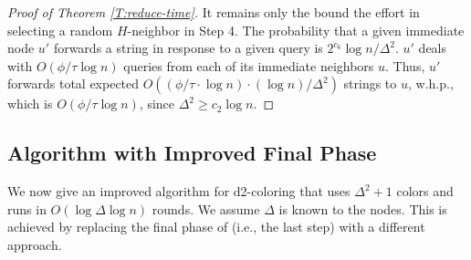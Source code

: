 \begin{proof}[Proof of Theorem \ref{T:reduce-time}]
It remains only the bound the effort in selecting a random $H$-neighbor in Step 4.
The probability that a given immediate node $u'$ forwards a string in response to a given query is $2^{c_6}\log n / \Delta^2$. $u'$ deals with $O(\phi/\tau \log n)$ queries from each of its immediate neighbors $u$.
 Thus, $u'$ forwards total expected $O((\phi/\tau \cdot \log n) \cdot (\log n) /\Delta^2)$ 
strings to $u$, w.h.p., which is $O(\phi/\tau \log n)$, since $\Delta^2 \ge c_2 \log n$. 
%
\end{proof}

\clearpage

\subsection{Algorithm with Improved Final Phase}

We now give an improved algorithm for d2-coloring that uses $\Delta^2+1$ colors and runs in $O(\log \Delta\log n)$ rounds. We assume $\Delta$ is known to the nodes.
This is achieved by replacing the final phase of  (i.e., the last step) with a different approach.

